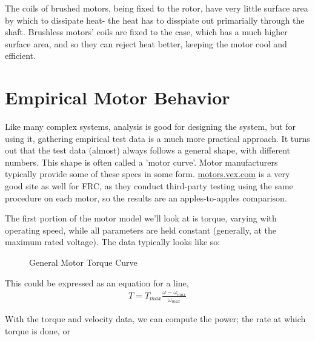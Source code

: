 \documentclass[10pt,letterpaper]{book}
\begin{document}
The coils of brushed motors, being fixed to the rotor, have very little surface area by which to dissipate heat- the heat has to disspiate out primarially through the shaft. Brushless motors' coils are fixed to the case, which has a much higher surface area, and so they can reject heat better, keeping the motor cool and efficient.


\section{Empirical Motor Behavior}

Like many complex systems, analysis is good for designing the system, but for using it, gathering empirical test data is a much more practical approach. It turns out that the test data (almost) always follows a general shape, with different numbers. This shape is often called a 'motor curve'. Motor manufacturers typically provide some of these specs in some form. \href{http://motors.vex.com}{\color{red}motors.vex.com} is a very good site as well for FRC, as they conduct third-party testing using the same procedure on each motor, so the results are an apples-to-apples comparison.


The first portion of the motor model we'll look at is torque, varying with operating speed, while all parameters are held constant (generally, at the maximum rated voltage). The data typically looks like so:

\begin{figure}[H] \centering \label{fig:motor_torque_curve}
\caption{General Motor Torque Curve}
\end{figure}

This could be expressed as an equation for a line,
\begin{align} \label{eq:motor_torque_curve}
  T = T_{max} \frac{\omega-\omega_{max}}{\omega_{max}}
\end{align}

With the torque and velocity data, we can compute the power; the rate at which torque is done, or
\end{document}
